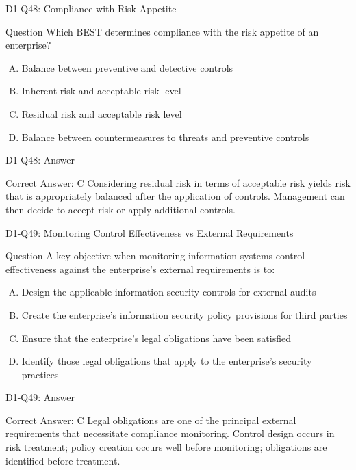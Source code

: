 \documentclass{beamer}
\begin{document}
	\begin{frame}{D1-Q48: Compliance with Risk Appetite}
		\begin{block}{Question}
			Which BEST determines compliance with the risk appetite of an enterprise?
		\end{block}
		\begin{enumerate}[(A)]
			\item Balance between preventive and detective controls
			\item Inherent risk and acceptable risk level
			\item Residual risk and acceptable risk level
			\item Balance between countermeasures to threats and preventive controls
		\end{enumerate}
	\end{frame}
	\begin{frame}{D1-Q48: Answer}
		\begin{block}{Correct Answer: C}
			Considering residual risk in terms of acceptable risk yields risk that is appropriately balanced after the application of controls. Management can then decide to accept risk or apply additional controls.
		\end{block}
	\end{frame}
	
	\begin{frame}{D1-Q49: Monitoring Control Effectiveness vs External Requirements}
		\begin{block}{Question}
			A key objective when monitoring information systems control effectiveness against the enterprise's external requirements is to:
		\end{block}
		\begin{enumerate}[(A)]
			\item Design the applicable information security controls for external audits
			\item Create the enterprise's information security policy provisions for third parties
			\item Ensure that the enterprise's legal obligations have been satisfied
			\item Identify those legal obligations that apply to the enterprise's security practices
		\end{enumerate}
	\end{frame}
	\begin{frame}{D1-Q49: Answer}
		\begin{block}{Correct Answer: C}
			Legal obligations are one of the principal external requirements that necessitate compliance monitoring. Control design occurs in risk treatment; policy creation occurs well before monitoring; obligations are identified before treatment.
		\end{block}
	\end{frame}
	
\end{document}
